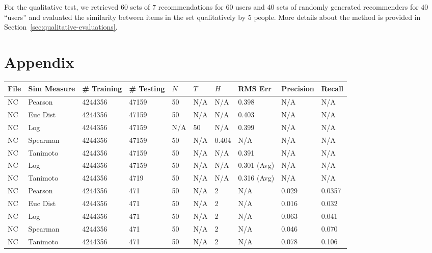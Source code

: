\documentclass{article}
\begin{document}
For the qualitative test, we retrieved $60$ sets of $7$ recommendations for $60$ users and $40$ sets of randomly
generated recommenders for $40$ ``users'' and evaluated the similarity between items in the set qualitatively by 5 
people. More details about the method is provided in Section~\ref{sec:qualitative-evaluations}. 

\section*{Appendix}

\begin{longtable}{ |p{1.7cm}|p{1.9cm}|p{1.5cm}|p{1.5cm}|p{0.75cm}|p{0.75cm}|p{0.75cm}|p{0.75cm}|p{1.5cm}|p{1.5cm}|}
    \hline
    File & Sim Measure & \# Training & \# Testing & $N$ & $T$ & $H$ & RMS Err & Precision & Recall \\ \hline\hline
    NC & Pearson & 4244356 & 47159 & 50 & N/A & N/A & 0.398 & N/A & N/A  \\ \hline
    NC  & Euc Dist & 4244356 & 47159 & 50 & N/A & N/A & 0.403 & N/A & N/A   \\ \hline
    NC  & Log & 4244356 & 47159  & N/A &  50 & N/A& 0.399 & N/A & N/A  \\ \hline
    NC  & Spearman & 4244356 & 47159  & 50 & N/A & 0.404 & N/A & N/A & N/A \\ \hline
    NC  & Tanimoto & 4244356 & 47159 & 50 & N/A& N/A & 0.391 & N/A & N/A \\ \hline
    NC  & Log & 4244356 & 47159 & 50 & N/A& N/A & 0.301 (Avg) & N/A & N/A \\ \hline
    NC  & Tanimoto & 4244356 & 4719 & 50 & N/A & N/A & 0.316 (Avg) & N/A & N/A \\ \hline
    
    NC  & Pearson & 4244356 & 471 & 50 & N/A  & 2 & N/A & 0.029 & 0.0357  \\ \hline
    NC  & Euc Dist & 4244356 & 471 & 50 & N/A  & 2 & N/A & 0.016 & 0.032   \\ \hline
    NC  & Log & 4244356 & 471& 50 & N/A & 2 & N/A & 0.063 & 0.041  \\ \hline
    NC  & Spearman & 4244356 & 471 & 50 & N/A  & 2 & N/A &0.046 & 0.070 \\ \hline
    NC  & Tanimoto & 4244356 & 471 & 50 & N/A  & 2 & N/A & 0.078 & 0.106 \\ \hline
    

\end{longtable}
\end{document}
